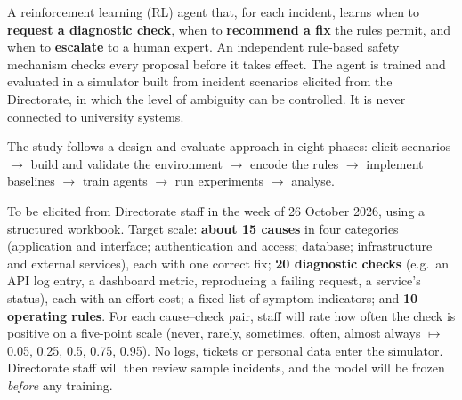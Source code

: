 \documentclass[10pt,a4paper]{article}
\newcommand{\sect}[1]{\par\vspace{3pt}{\bfseries\large #1}\par}
\newcommand{\sub}[1]{\par\vspace{1pt}{\bfseries #1}\par}
\begin{document}
\sect{4. Proposed Solution}
A reinforcement learning (RL) agent that, for each incident, learns when to \textbf{request a diagnostic check}, when to \textbf{recommend a fix} the rules permit, and when to \textbf{escalate} to a human expert. An independent rule-based safety mechanism checks every proposal before it takes effect. The agent is trained and evaluated in a simulator built from incident scenarios elicited from the Directorate, in which the level of ambiguity can be controlled. It is never connected to university systems.

\sect{5. Proposed Methodology and Implementation}
The study follows a design-and-evaluate approach in eight phases: elicit scenarios $\rightarrow$ build and validate the environment $\rightarrow$ encode the rules $\rightarrow$ implement baselines $\rightarrow$ train agents $\rightarrow$ run experiments $\rightarrow$ analyse.

\sub{5.1 Scenario model (input data)}
To be elicited from Directorate staff in the week of 26 October 2026, using a structured workbook. Target scale: \textbf{about 15 causes} in four categories (application and interface; authentication and access; database; infrastructure and external services), each with one correct fix; \textbf{20 diagnostic checks} (e.g.\ an API log entry, a dashboard metric, reproducing a failing request, a service's status), each with an effort cost; a fixed list of symptom indicators; and \textbf{10 operating rules}. For each cause--check pair, staff will rate how often the check is positive on a five-point scale (never, rarely, sometimes, often, almost always $\mapsto$ 0.05, 0.25, 0.5, 0.75, 0.95). No logs, tickets or personal data enter the simulator. Directorate staff will then review sample incidents, and the model will be frozen \emph{before} any training.
\end{document}
